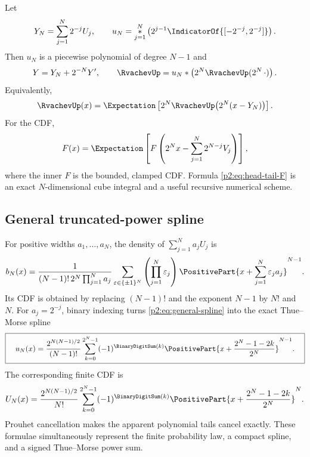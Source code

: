 \documentclass[11pt]{article}
\theoremstyle{definition}
\theoremstyle{remark}
\begin{document}
Let
\begin{equation}
 Y_N=\sum_{j=1}^N2^{-j}U_j,
 \qquad
 u_N=\mathop{\ast}_{j=1}^{N}
 \left(2^{j-1}\IndicatorOf{[-2^{-j},2^{-j}]}\right).        \label{p2:eq:finite-box-spline}
\end{equation}
Then $u_N$ is a piecewise polynomial of degree $N-1$ and
\begin{equation}
 Y=Y_N+2^{-N}Y',
 \qquad
 \RvachevUp=u_N\ast\left(2^N\RvachevUp(2^N\,\cdot)\right).           \label{p2:eq:head-tail-up}
\end{equation}
Equivalently,
\begin{equation}
 \RvachevUp(x)=\Expectation\left[2^N\RvachevUp\bigl(2^N(x-Y_N)\bigr)\right].   \label{p2:eq:head-tail-up-expectation}
\end{equation}
For the CDF,
\begin{equation}
 F(x)=\Expectation\left[
 F\left(2^Nx-\sum_{j=1}^N2^{N-j}V_j\right)
 \right],                                                \label{p2:eq:head-tail-F}
\end{equation}
where the inner $F$ is the bounded, clamped CDF.  Formula \eqref{p2:eq:head-tail-F} is an exact
$N$-dimensional cube integral and a useful recursive numerical scheme.

\subsection{General truncated-power spline}

For positive widths $a_1,\dots,a_N$, the density of
$\sum_{j=1}^Na_jU_j$ is
\begin{equation}
 b_N(x)=\frac{1}{(N-1)!\,2^N\prod_{j=1}^Na_j}
 \sum_{\varepsilon\in\{\pm1\}^N}
 \left(\prod_{j=1}^N\varepsilon_j\right)
 \PositivePart{x+\sum_{j=1}^N\varepsilon_ja_j}^{N-1}.        \label{p2:eq:general-spline}
\end{equation}
Its CDF is obtained by replacing $(N-1)!$ and the exponent $N-1$ by $N!$ and $N$.
For $a_j=2^{-j}$, binary indexing turns \eqref{p2:eq:general-spline} into the exact
Thue--Morse spline
\begin{equation}
 \boxed{\quad
 u_N(x)=\frac{2^{N(N-1)/2}}{(N-1)!}
 \sum_{k=0}^{2^N-1}(-1)^{\BinaryDigitSum(k)}
 \PositivePart{x+\frac{2^N-1-2k}{2^N}}^{N-1}.
 \quad}                                                  \label{p2:eq:TM-spline}
\end{equation}
The corresponding finite CDF is
\begin{equation}
 U_N(x)=\frac{2^{N(N-1)/2}}{N!}
 \sum_{k=0}^{2^N-1}(-1)^{\BinaryDigitSum(k)}
 \PositivePart{x+\frac{2^N-1-2k}{2^N}}^{N}.                  \label{p2:eq:TM-spline-cdf}
\end{equation}
Prouhet cancellation makes the apparent polynomial tails cancel exactly.  These formulae
simultaneously represent the finite probability law, a compact spline, and a signed
Thue--Morse power sum.
\end{document}

